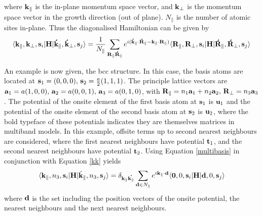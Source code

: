 \documentclass[a4paper, 12pt]{article}
\begin{document}
	where ${\bf k}_\parallel$ is the in-plane momentum space vector, and ${\bf k}_\perp$ is the momentum space vector in the growth direction (out of plane). $N_\parallel$ is the number of atomic sites in-plane.
	Thus the diagonalised Hamiltonian can be given by 
	\begin{equation}\label{multibasis}
		\langle{\bf k}_\parallel, {\bf k}_\perp, {\bf s}_i|{\bf H}|{\bf \acute{k}}_\parallel, {\bf \acute{k}}_\perp, {\bf s}_j\rangle = \frac{1}{N_\parallel}\sum_{\bf R_\parallel \acute{R}_\parallel}  e^{i({\bf \acute{k}}_\parallel\cdot {\bf \acute{R}}_\parallel-{\bf k}_\parallel\cdot {\bf R}_\parallel)} \langle{\bf R}_\parallel,{\bf R}_\perp, {\bf s}_i|{\bf H}|{\bf \acute{R}}_\parallel,{\bf \acute{R}}_\perp, {\bf s}_j \rangle
	\end{equation}
	\par An example is now given, the \gls{bcc} structure.
	In this case, the basis atoms are located at ${\bf s}_1=(0,0,0), \, {\bf s}_2=\frac{a}{2}(1,1,1)$.
	The principle lattice vectors are ${\bf a}_1 = a(1,0,0), \, {\bf a}_2 = a(0,0,1), \, {\bf a}_3 = a(0,1,0)$,
	with ${\bf R}_\parallel = n_1{\bf a}_1 + n_2{\bf a}_2, \, {\bf R}_\perp = n_3 {\bf a}_3$.
	The potential of the onsite element of the first basis atom at ${\bf s}_1$ is ${\bf u}_1$ and the potential of the onsite element of the second basis atom at ${\bf s}_2$ is ${\bf u}_2$,
	where the bold typeface of these potentials indicates they are themselves matrices in multiband models.
	In this example, offsite terms up to second nearest neighbours are considered, where the first nearest neighbours have potential ${\bf t}_1$, and the second nearest neighbours have potential ${\bf t}_2$.
	Using Equation \eqref{multibasis} in conjunction with Equation \eqref{kk} yields
	\begin{equation}
		\langle{\bf k}_\parallel, n_3, {\bf s}_i|{\bf H}|\acute{\bf k}_\parallel, n_3, {\bf s}_j\rangle = \delta_{\bf k_\parallel\acute{k_\parallel}}\sum_{{\bf d}\in N_\parallel}e^{i\bf k_\parallel \cdot d}\langle{\bf 0}, 0, {\bf s}_i|{\bf H}|{\bf d}, 0, {\bf s}_j\rangle
	\end{equation}
	where $\bf d$ is the set including the position vectors of the onsite potential, the nearest neighbours and the next nearest neighbours.
\end{document}
